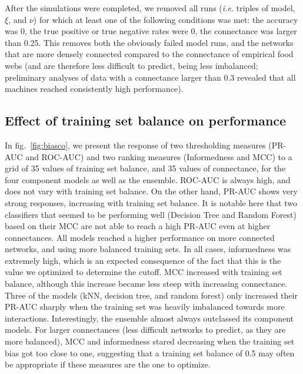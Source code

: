 \documentclass[10pt,oneside]{article}
\begin{document}
After the simulations were completed, we removed all runs (\emph{i.e.}
triples of model, \(\xi\), and \(\nu\)) for which at least one of the
following conditions was met: the accuracy was 0, the true positive or
true negative rates were 0, the connectance was larger than 0.25. This
removes both the obviously failed model runs, and the networks that are
more densely connected compared to the connectance of empirical food
webs (and are therefore less difficult to predict, being less
imbalanced; preliminary analyses of data with a connectance larger than
0.3 revealed that all machines reached consistently high performance).

\hypertarget{effect-of-training-set-balance-on-performance}{%
\subsection{Effect of training set balance on
performance}\label{effect-of-training-set-balance-on-performance}}

In fig.~\ref{fig:biasco}, we present the response of two thresholding
measures (PR-AUC and ROC-AUC) and two ranking measures (Informedness and
MCC) to a grid of 35 values of training set balance, and 35 values of
connectance, for the four component models as well as the ensemble.
ROC-AUC is always high, and does not vary with training set balance. On
the other hand, PR-AUC shows very strong responses, increasing with
training set balance. It is notable here that two classifiers that
seemed to be performing well (Decision Tree and Random Forest) based on
their MCC are not able to reach a high PR-AUC even at higher
connectances. All models reached a higher performance on more connected
networks, and using more balanced training sets. In all cases,
informedness was extremely high, which is an expected consequence of the
fact that this is the value we optimized to determine the cutoff. MCC
increased with training set balance, although this increase became less
steep with increasing connectance. Three of the models (kNN, decision
tree, and random forest) only increased their PR-AUC sharply when the
training set was heavily imbalanced towards more interactions.
Interestingly, the ensemble almost always outclassed its component
models. For larger connectances (less difficult networks to predict, as
they are more balanced), MCC and informedness stared decreasing when the
training set bias got too close to one, suggesting that a training set
balance of 0.5 may often be appropriate if these measures are the one to
optimize.
\end{document}
